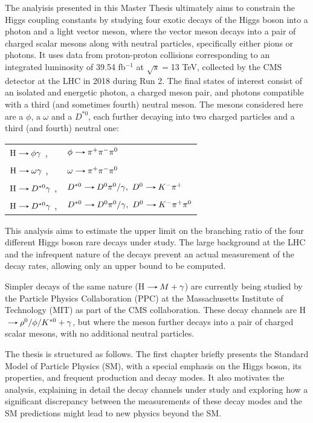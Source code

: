 The analyisis presented in this Master Thesis ultimately aims to constrain the Higgs coupling constants by studying four exotic decays of the Higgs boson into a photon and a light vector meson, where the vector meson decays into a pair of charged scalar mesons along with neutral particles, specifically either pions or photons. It uses data from proton-proton collisions corresponding to an integrated luminosity of 39.54 fb$^{-1}$ at $\sqrt{s}=$13 TeV, collected by the CMS detector at the LHC in 2018 during Run 2. The final states of interest consist of an isolated and energetic photon, a charged meson pair, and photons compatible with a third (and sometimes fourth) neutral meson. The mesons considered here are a $\phi$, a $\omega$ and a $D^{*0}$, each further decaying into two charged particles and a third (and fourth) neutral one:

\begin{table}[ht]
    \centering
    \begin{tabular}{ll}
        $\text{H}\decaysto \phi\gamma$ ,& $\phi\decaysto \pi^+\pi^-\pi^0$ \\
        $\text{H}\decaysto \omega\gamma$ ,& $\omega\decaysto \pi^+\pi^-\pi^0$\\
        $\text{H}\decaysto D^{*0}\gamma$ ,& $D^{*0}\decaysto D^{0}\pi^{0}/\gamma,\ D^{0}\decaysto K^{-}\pi^{+}$\\
        $\text{H}\decaysto D^{*0}\gamma$ ,& $D^{*0}\decaysto D^{0}\pi^{0}/\gamma,\ D^{0}\decaysto K^{-}\pi^{+}\pi^{0}$
    \end{tabular}
\end{table}

This analysis aims to estimate the upper limit on the branching ratio of the four different Higgs boson rare decays under study. The large background at the LHC and the infrequent nature of the decays prevent an actual measurement of the decay rates, allowing only an upper bound to be computed.

Simpler decays of the same nature (H$\decaysto M + \gamma$) are currently being studied by the Particle Physics Collaboration (PPC) at the Massachusetts Institute of Technology (MIT) as part of the CMS collaboration. These decay channels are H$\decaysto \rho^0/\phi/K^{*0} + \gamma$, but where the meson further decays into a pair of charged scalar mesons, with no additional neutral particles.

The thesis is structured as follows. The first chapter briefly presents the Standard Model of Particle Physics (SM), with a special emphasis on the Higgs boson, its properties, and frequent production and decay modes. It also motivates the analysis, explaining in detail the decay channels under study and exploring how a significant discrepancy between the measurements of these decay modes and the SM predictions might lead to new physics beyond the SM.

